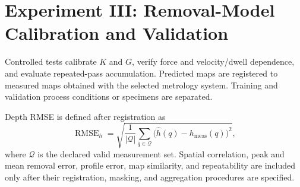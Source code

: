 \begin{table}
\centering
\caption{Planned force-aware IL ablations. Blank entries await experimental results.}
\label{tab:force_il_ablation}
\scriptsize
{}
\end{table}
\clearpage

\section{Experiment III: Removal-Model Calibration and Validation}
Controlled tests calibrate \(K\) and \(G\), verify force and velocity/dwell dependence, and evaluate repeated-pass accumulation. Predicted maps are registered to measured maps obtained with the selected metrology system. Training and validation process conditions or specimens are separated.

Depth RMSE is defined after registration as
\begin{equation}
  \operatorname{RMSE}_h
  =
  \sqrt{\frac{1}{|\mathcal{Q}|}
  \sum_{q\in\mathcal{Q}}
  \bigl(\hat h(q)-h_{\mathrm{meas}}(q)\bigr)^2},
  \label{eq:depth_rmse}
\end{equation}
where \(\mathcal{Q}\) is the declared valid measurement set. Spatial correlation, peak and mean removal error, profile error, map similarity, and repeatability are included only after their registration, masking, and aggregation procedures are specified.

